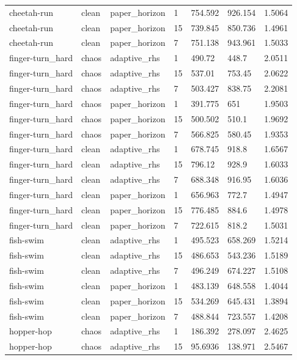 \begin{tabular}{lllllll}
cheetah-run & clean & paper\_horizon & 1 & 754.592 & 926.154 & 1.5064 \\
cheetah-run & clean & paper\_horizon & 15 & 739.845 & 850.736 & 1.4961 \\
cheetah-run & clean & paper\_horizon & 7 & 751.138 & 943.961 & 1.5033 \\
finger-turn\_hard & chaos & adaptive\_rhs & 1 & 490.72 & 448.7 & 2.0511 \\
finger-turn\_hard & chaos & adaptive\_rhs & 15 & 537.01 & 753.45 & 2.0622 \\
finger-turn\_hard & chaos & adaptive\_rhs & 7 & 503.427 & 838.75 & 2.2081 \\
finger-turn\_hard & chaos & paper\_horizon & 1 & 391.775 & 651 & 1.9503 \\
finger-turn\_hard & chaos & paper\_horizon & 15 & 500.502 & 510.1 & 1.9692 \\
finger-turn\_hard & chaos & paper\_horizon & 7 & 566.825 & 580.45 & 1.9353 \\
finger-turn\_hard & clean & adaptive\_rhs & 1 & 678.745 & 918.8 & 1.6567 \\
finger-turn\_hard & clean & adaptive\_rhs & 15 & 796.12 & 928.9 & 1.6033 \\
finger-turn\_hard & clean & adaptive\_rhs & 7 & 688.348 & 916.95 & 1.6036 \\
finger-turn\_hard & clean & paper\_horizon & 1 & 656.963 & 772.7 & 1.4947 \\
finger-turn\_hard & clean & paper\_horizon & 15 & 776.485 & 884.6 & 1.4978 \\
finger-turn\_hard & clean & paper\_horizon & 7 & 722.615 & 818.2 & 1.5031 \\
fish-swim & clean & adaptive\_rhs & 1 & 495.523 & 658.269 & 1.5214 \\
fish-swim & clean & adaptive\_rhs & 15 & 486.653 & 543.236 & 1.5189 \\
fish-swim & clean & adaptive\_rhs & 7 & 496.249 & 674.227 & 1.5108 \\
fish-swim & clean & paper\_horizon & 1 & 483.139 & 648.558 & 1.4044 \\
fish-swim & clean & paper\_horizon & 15 & 534.269 & 645.431 & 1.3894 \\
fish-swim & clean & paper\_horizon & 7 & 488.844 & 723.557 & 1.4208 \\
hopper-hop & chaos & adaptive\_rhs & 1 & 186.392 & 278.097 & 2.4625 \\
hopper-hop & chaos & adaptive\_rhs & 15 & 95.6936 & 138.971 & 2.5467 \\

\end{tabular}
